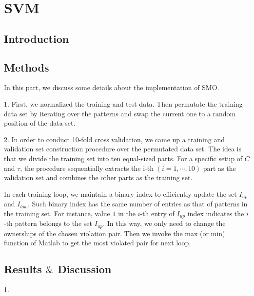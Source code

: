 \section{SVM}

\subsection{Introduction}



\subsection{Methods}

In this part, we discuss some details about the implementation of SMO.


1. First, we normalized the training and test data. Then permutate the training data set by iterating over the patterns and swap the current one to a random position of the data set.  


2. In order to conduct 10-fold cross validation, we came up a training and validation set construction procedure over the permutated data set. The idea is that we divide the training set into ten equal-sized parts. For a specific setup of $C$ and $\tau$, the procedure sequentially extracts the i-th $(i=1,\cdots,10)$ part as the validation set and combines the other parts as the training set.

In each training loop, we maintain a binary index to efficiently update the set $I_{up}$ and $I_{low}$. Such binary index has the same number of entries as that of patterns in the training set. For instance, value $1$ in the $i$-th entry of $I_{up}$ index indicates the $i$-th pattern belongs to the set $I_{up}$. In this way, we only need to change the ownerships of the chosen violation pair. Then we invoke the max (or min) function of Matlab to get the most violated pair for next loop.   


\subsection{Results	$\&$ Discussion}

1.




